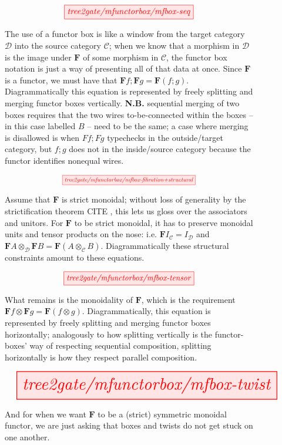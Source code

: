 \begin{figure}[h!]
\[\resizebox{0.5\textwidth}{!}{\tikzfig{tree2gate/mfunctorbox/mfbox-seq}}\]
\caption{The use of a functor box is like a window from the target category $\mathcal{D}$ into the source category $\mathcal{C}$; when we know that a morphism in $\mathcal{D}$ is the image under $\mathbf{F}$ of some morphism in $\mathcal{C}$, the functor box notation is just a way of presenting all of that data at once. Since $\mathbf{F}$ is a functor, we must have that $\mathbf{F}f ; \mathbf{F}g = \mathbf{F}(f;g)$. Diagrammatically this equation is represented by freely splitting and merging functor boxes vertically. \textbf{N.B.} sequential merging of two boxes requires that the two wires to-be-connected within the boxes -- in this case labelled $B$ -- need to be the same; a case where merging is disallowed is when $Ff;Fg$ typechecks in the outside/target category, but $f;g$ does not in the inside/source category because the functor identifies nonequal wires.}
\end{figure}

\begin{figure}[h!]
\[\resizebox{0.5\textwidth}{!}{\tikzfig{tree2gate/mfunctorbox/mfbox-fibration+structural}}\]
\caption{Assume that $\mathbf{F}$ is strict monoidal; without loss of generality by the strictification theorem \bR CITE \e, this lets us gloss over the associators and unitors. For $\mathbf{F}$ to be strict monoidal, it has to preserve monoidal units and tensor products on the nose: i.e. $\mathbf{F}I_\mathcal{C} = I_\mathcal{D}$ and $\mathbf{F}A \otimes_\mathcal{D} \mathbf{F}B = \mathbf{F}(A \otimes_\mathcal{C} B)$. Diagrammatically these structural constraints amount to these equations.}
\end{figure}

\begin{figure}[h!]
\[\resizebox{0.5\textwidth}{!}{\tikzfig{tree2gate/mfunctorbox/mfbox-tensor}}\]
\caption{What remains is the monoidality of $\mathbf{F}$, which is the requirement $\mathbf{F}f \otimes \mathbf{F}g = \mathbf{F}(f \otimes g)$. Diagrammatically, this equation is represented by freely splitting and merging functor boxes horizontally; analogously to how splitting vertically is the functor-boxes' way of respecting sequential composition, splitting horizontally is how they respect parallel composition.}
\end{figure}

\begin{figure}[h!]
\[\resizebox{\textwidth}{!}{\tikzfig{tree2gate/mfunctorbox/mfbox-twist}}\]
\caption{And for when we want $\mathbf{F}$ to be a (strict) symmetric monoidal functor, we are just asking that boxes and twists do not get stuck on one another.}
\end{figure}


